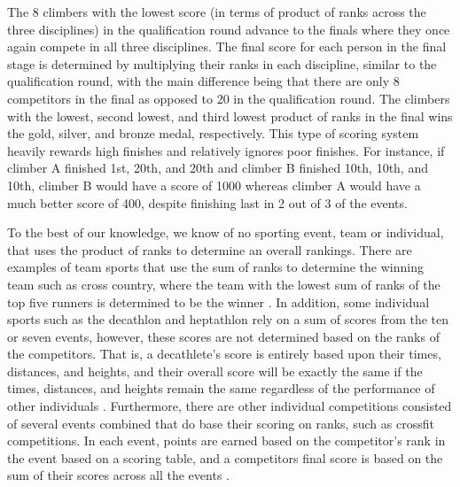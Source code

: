 \documentclass[12pt]{article}
\begin{document}
The 8 climbers with the lowest score (in terms of product of ranks
across the three disciplines) in the qualification round advance to the
finals where they once again compete in all three disciplines. The final
score for each person in the final stage is determined by multiplying
their ranks in each discipline, similar to the qualification round, with
the main difference being that there are only 8 competitors in the final
as opposed to 20 in the qualification round. The climbers with the
lowest, second lowest, and third lowest product of ranks in the final
wins the gold, silver, and bronze medal, respectively. This type of
scoring system heavily rewards high finishes and relatively ignores poor
finishes. For instance, if climber A finished 1st, 20th, and 20th and
climber B finished 10th, 10th, and 10th, climber B would have a score of
1000 whereas climber A would have a much better score of 400, despite
finishing last in 2 out of 3 of the events.

To the best of our knowledge, we know of no sporting event, team or
individual, that uses the product of ranks to determine an overall
rankings. There are examples of team sports that use the sum of ranks to
determine the winning team such as cross country, where the team with
the lowest sum of ranks of the top five runners is determined to be the
winner \citep{hammond2007, boudreau2018}. In addition, some individual
sports such as the decathlon and heptathlon rely on a sum of scores from
the ten or seven events, however, these scores are not determined based
on the ranks of the competitors. That is, a decathlete's score is
entirely based upon their times, distances, and heights, and their
overall score will be exactly the same if the times, distances, and
heights remain the same regardless of the performance of other
individuals \citep{westera2006}. Furthermore, there are other individual
competitions consisted of several events combined that do base their
scoring on ranks, such as crossfit competitions. In each event, points
are earned based on the competitor's rank in the event based on a
scoring table, and a competitors final score is based on the sum of
their scores across all the events \citep{crossfit2021}.
\end{document}
